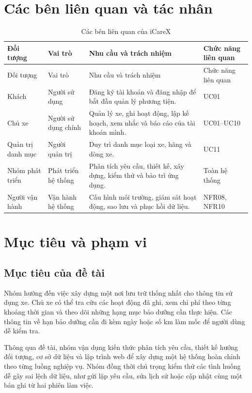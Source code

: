 \section{Các bên liên quan và tác nhân}
\begin{smalltable}\begin{longtable}{L{2.7cm}L{2.3cm}L{7.1cm}L{2.4cm}}
\caption{Các bên liên quan của iCareX}\\\toprule Đối tượng & Vai trò & Nhu cầu và trách nhiệm & Chức năng liên quan\\\midrule\endfirsthead
\toprule Đối tượng & Vai trò & Nhu cầu và trách nhiệm & Chức năng liên quan\\\midrule\endhead
Khách & Người sử dụng & Đăng ký tài khoản và đăng nhập để bắt đầu quản lý phương tiện. & UC01\\
Chủ xe & Người sử dụng chính & Quản lý xe, ghi hoạt động, lập kế hoạch, xem nhắc và báo cáo của tài khoản mình. & UC01--UC10\\
Quản trị danh mục & Người quản trị & Duy trì danh mục loại xe, hãng và dòng xe. & UC11\\
Nhóm phát triển & Phát triển hệ thống & Phân tích yêu cầu, thiết kế, xây dựng, kiểm thử và bảo trì ứng dụng. & Toàn hệ thống\\
Người vận hành & Vận hành hệ thống & Cấu hình môi trường, giám sát hoạt động, sao lưu và phục hồi dữ liệu. & NFR08, NFR10\\\bottomrule
\end{longtable}\end{smalltable}

\section{Mục tiêu và phạm vi}
\subsection{Mục tiêu của đề tài}
Nhóm hướng đến việc xây dựng một nơi lưu trữ thống nhất cho thông tin sử dụng xe. Chủ xe có thể tra cứu các hoạt động đã ghi, xem chi phí theo từng khoảng thời gian và theo dõi những hạng mục bảo dưỡng cần thực hiện. Các thông tin về hạn bảo dưỡng cần đi kèm ngày hoặc số km làm mốc để người dùng dễ kiểm tra.

Thông qua đề tài, nhóm vận dụng kiến thức phân tích yêu cầu, thiết kế hướng đối tượng, cơ sở dữ liệu và lập trình web để xây dựng một hệ thống hoàn chỉnh theo từng luồng nghiệp vụ. Nhóm đồng thời chú trọng kiểm thử các tình huống dễ gây sai lệch dữ liệu, như gửi lặp yêu cầu, sửa lịch sử hoặc cập nhật cùng một bản ghi từ hai phiên làm việc.

